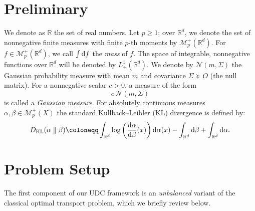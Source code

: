 \documentclass{ifacconf}
\newcommand{\R}{{\mathbb R}}
\newcommand{\rmd}{{\rm d}}
\newcommand{\Rd}{\R ^{d}}
\newcommand{\calM}{{\mathcal M}}
\newcommand{\calN}{{\mathcal N}}
\newcommand{\KL}[2]{D_{\mathrm{KL}}(#1 \parallel #2)}
\begin{document}
\section{Preliminary}\label{section:Preliminary}
We denote as \(\R\) the set of real numbers. Let \(p \ge 1\); over \(\Rd\), we denote the set of nonnegative finite measures with finite $p$-th moments by $\calM_p^{+}(\Rd)$. For $f \in \calM_p^{+}(\Rd)$, we call
$\int \rmd f$ the \emph{mass} of $f$. The space of integrable, nonnegative functions over \(\Rd\) will be denoted by \(L^{1}_{+}(\Rd)\). We denote by $\calN(m,\Sigma)$ the Gaussian probability measure with mean $m$ and covariance $\Sigma \succeq O$ (the null matrix). For a nonnegative scalar $c>0$, a measure of the form
\[
c\,\calN(m,\Sigma)
\]
is called a \emph{Gaussian measure}. For absolutely continuous measures $\alpha, \beta \in  \calM_p^{+}(X)$ 
the standard Kullback--Leibler (KL) divergence is defined by:
\begin{equation*}\label{eq:KL_def}
    \KL{\alpha}{\beta} \coloneqq \int_{\mathbb{R}^d} \log \left(\frac{\rmd\alpha}{\rmd\beta}(x)\right) \rmd\alpha(x) - \int_{\Rd} \rmd\beta + \int_{\Rd} \rmd\alpha .
\end{equation*}






\section{Problem Setup}\label{sec:problem}
The first component of our UDC framework is an \emph{unbalanced} variant of the classical optimal transport problem, which we briefly review below.
\end{document}
